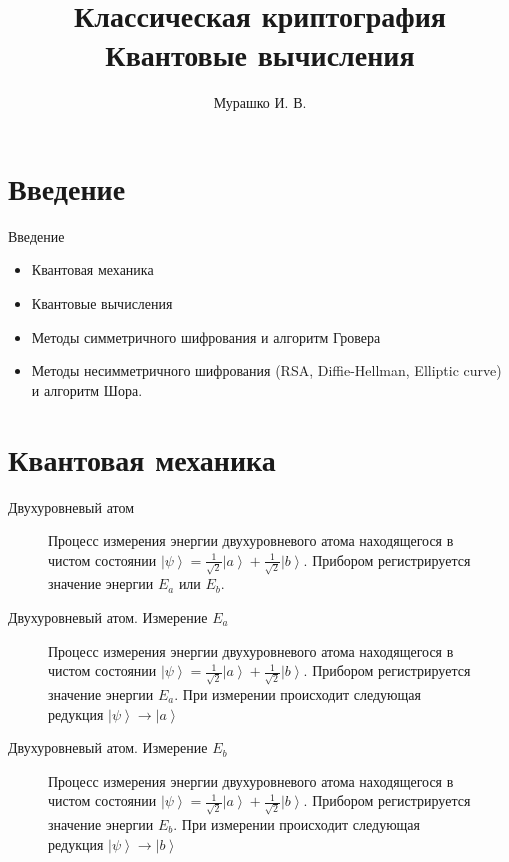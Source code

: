 \documentclass[10pt,pdf,hyperref={unicode}]{beamer}
\title[Криптография и квантовые вычисления]{Классическая
  криптография\\Квантовые вычисления}
\author{Мурашко И. В.}
\institute{Санкт Петербургский Государственный Политехнический Университет}
\date{}
\begin{document}
\section{Введение}

\begin{frame}{Введение}
\begin{itemize}
\item Квантовая механика
\item Квантовые вычисления
\item Методы симметричного шифрования и алгоритм Гровера
\item Методы несимметричного шифрования (RSA, Diffie-Hellman, Elliptic
curve) и алгоритм Шора.
\end{itemize}
\end{frame}

\section{Квантовая механика}
\begin{frame}{Двухуровневый атом}
\begin{figure}
\centering



\caption{Процесс измерения энергии двухуровневого атома находящегося в
чистом состоянии $\left|\psi\right> = 
\frac{1}{\sqrt{2}}\left|a\right> + \frac{1}{\sqrt{2}}\left|b\right>$.
Прибором регистрируется значение энергии $E_a$ или $E_b$.
}
\label{fig:add:mesure_ex}
\end{figure}
\end{frame}

\begin{frame}{Двухуровневый атом. Измерение $E_a$}
\begin{figure}
\centering



\caption{Процесс измерения энергии двухуровневого атома находящегося в
чистом состоянии $\left|\psi\right> = 
\frac{1}{\sqrt{2}}\left|a\right> + \frac{1}{\sqrt{2}}\left|b\right>$.
Прибором регистрируется значение энергии $E_a$. При измерении
происходит следующая редукция $\left|\psi\right> \to \left|a\right>$
}
\label{fig:add:mesure_ex_a}
\end{figure}
\end{frame}

\begin{frame}{Двухуровневый атом. Измерение $E_b$}
\begin{figure}
\centering



\caption{Процесс измерения энергии двухуровневого атома находящегося в
чистом состоянии $\left|\psi\right> = 
\frac{1}{\sqrt{2}}\left|a\right> + \frac{1}{\sqrt{2}}\left|b\right>$.
Прибором регистрируется значение энергии $E_b$. При измерении
происходит следующая редукция $\left|\psi\right> \to \left|b\right>$
}
\label{fig:add:mesure_ex_b}
\end{figure}
\end{frame}
\end{document}
